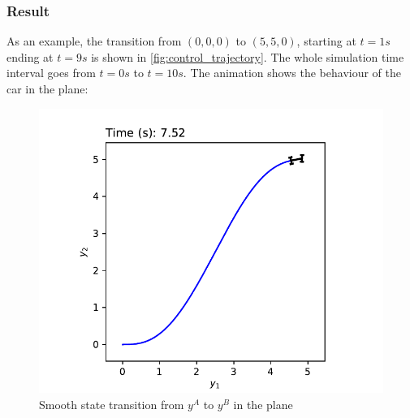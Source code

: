 \documentclass[a4paper,11pt,headings=standardclasses,parskip=half]{scrartcl}
\begin{document}
\subsubsection{Result}
\label{subsec:result}
As an example, the transition from $(0, 0, 0)$ to $(5, 5, 0)$, starting at $t=1s$ ending at $t=9s$ is shown in \autoref{fig:control_trajectory}. The whole simulation time interval goes from $t=0s$ to $t=10s$.
The animation shows the behaviour of the car in the plane:
\begin{figure}[ht]
\centering
\includegraphics[scale=1]{img/plane_trajectory.pdf}
\caption{Smooth state transition from $y^A$ to $y^B$ in the plane}
\label{fig:plane_trajectory}
\end{figure}
\end{document}

